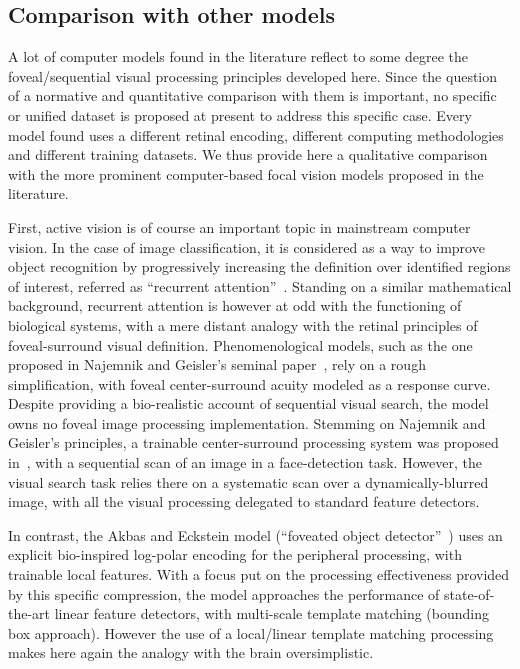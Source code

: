 \subsection{Comparison with other models}
A lot of computer models found in the literature reflect to some degree the foveal/sequential visual processing principles developed here. Since the question of a normative and quantitative comparison with them is important, no specific or unified dataset is proposed at present to address this specific case. Every model found uses a different retinal encoding, different computing methodologies and different training datasets. We thus provide here a qualitative comparison with the more prominent computer-based focal vision models proposed in the literature.

First, active vision is of course an important topic in mainstream computer vision. In the case of image classification, it is considered as a way to improve object recognition by progressively increasing the definition over identified regions of interest, referred as ``recurrent attention''~\cite{mnih2014recurrent,fu2017look}. Standing on a similar mathematical background, recurrent attention is however at odd with the functioning of biological systems, with a mere distant analogy with the retinal principles of foveal-surround visual definition.
%
Phenomenological models, such as the one proposed in Najemnik and Geisler's seminal paper~\cite{Najemnik05}, rely on a rough simplification, with foveal center-surround acuity modeled as a response curve. Despite providing a bio-realistic account of sequential visual search, the model owns no foveal image processing implementation. Stemming on Najemnik and Geisler's principles, a trainable center-surround processing system was proposed in~\cite{Butko2010infomax}, with a sequential scan of an image in a face-detection task. However, the visual search task relies there on a systematic scan over a dynamically-blurred image, with all the visual processing delegated to standard feature detectors.

In contrast, the Akbas and Eckstein model (“foveated object detector”~\cite{akbas2017object}) uses an explicit bio-inspired log-polar encoding for the peripheral processing, with trainable local features. With a focus put on the processing effectiveness provided by this specific compression, the model approaches the performance of state-of-the-art linear feature detectors, with multi-scale template matching (bounding box approach). However the use of a local/linear template matching processing makes here again the analogy with the brain oversimplistic.

